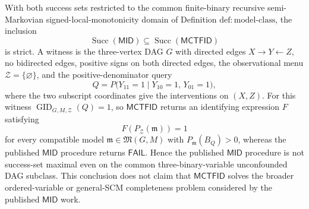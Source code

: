 With both success sets restricted to the common finite-binary recursive semi-Markovian signed-local-monotonicity domain of Definition \(\mathrm{def:model\text{-}class}\), the inclusion
\[
 \operatorname{Succ}(\mathsf{MID})
 \subseteq
 \operatorname{Succ}(\mathsf{MCTFID})
\]
is strict.  A witness is the three-vertex DAG \(G\) with directed edges \(X\to Y\leftarrow Z\), no bidirected edges, positive signs on both directed edges, the observational menu \(\mathcal Z=\{\varnothing\}\), and the positive-denominator query
\[
 Q=P\bigl(Y_{11}=1\mid Y_{10}=1,\,Y_{01}=1\bigr),
\]
where the two subscript coordinates give the interventions on \((X,Z)\).  For this witness \(\operatorname{GID}_{G,M,\mathcal Z}(Q)=1\), so \(\mathsf{MCTFID}\) returns an identifying expression \(F\) satisfying
\[
 F(P_{\mathcal Z}(\mathfrak m))=1
\]
for every compatible model \(\mathfrak m\in\mathfrak M(G,M)\) with \(P_{\mathfrak m}(B_Q)>0\), whereas the published \(\mathsf{MID}\) procedure returns \(\mathsf{FAIL}\).  Hence the published \(\mathsf{MID}\) procedure is not success-set maximal even on the common three-binary-variable unconfounded DAG subclass.  This conclusion does not claim that \(\mathsf{MCTFID}\) solves the broader ordered-variable or general-SCM completeness problem considered by the published \(\mathsf{MID}\) work.